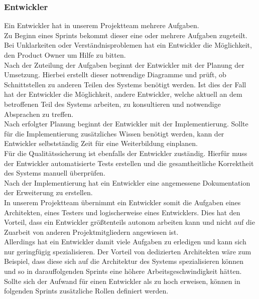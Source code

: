 \documentclass{article}
\begin{document}
\subsubsection{Entwickler}
Ein Entwickler hat in unserem Projektteam mehrere Aufgaben.\\
Zu Beginn eines Sprints bekommt dieser eine oder mehrere Aufgaben zugeteilt.
Bei Unklarkeiten oder Verständnisproblemen hat ein Entwickler die Möglichkeit, den Product Owner um Hilfe zu bitten.\\
Nach der Zuteilung der Aufgaben beginnt der Entwickler mit der Planung der Umsetzung.
Hierbei erstellt dieser notwendige Diagramme und prüft, ob Schnittstellen zu anderen Teilen des Systems benötigt werden.
Ist dies der Fall hat der Entwickler die Möglichkeit, andere Entwickler, welche aktuell an dem betroffenen Teil des Systems arbeiten, zu konsultieren und notwendige Absprachen zu treffen.\\
Nach erfolgter Planung beginnt der Entwickler mit der Implementierung.
Sollte für die Implementierung zusätzliches Wissen benötigt werden, kann der Entwickler selbstständig Zeit für eine Weiterbildung einplanen.\\
Für die Qualitätssicherung ist ebenfalls der Entwickler zuständig.
Hierfür muss der Entwickler automatisierte Tests erstellen und die gesamtheitliche Korrektheit des Systems manuell überprüfen.\\
Nach der Implementierung hat ein Entwickler eine angemessene Dokumentation der Erweiterung zu erstellen.\\
In unserem Projektteam übernimmt ein Entwickler somit die Aufgaben eines Architekten, eines Testers und logischerweise eines Entwicklers.
Dies hat den Vorteil, dass ein Entwickler größtenteils autonom arbeiten kann und nicht auf die Zuarbeit von anderen Projektmitgliedern angewiesen ist.\\
Allerdings hat ein Entwickler damit viele Aufgaben zu erledigen und kann sich nur geringfügig spezialisieren.
Der Vorteil von dedizierten Architekten wäre zum Beispiel, dass diese sich auf die Architektur des Systems spezialisieren können und so in darauffolgenden Sprints eine höhere Arbeitsgeschwindigkeit hätten.\\
Sollte sich der Aufwand für einen Entwickler als zu hoch erweisen, können in folgenden Sprints zusätzliche Rollen definiert werden.
\end{document}
